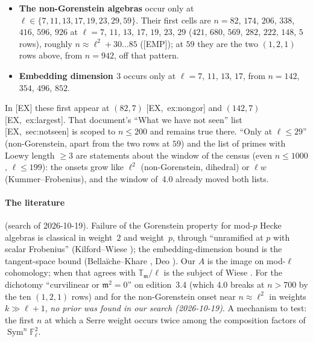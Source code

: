 \documentclass[11pt]{article}
\newcommand{\Fl}{\mathbb{F}_\ell}
\newcommand{\T}{\mathbb{T}}
\newcommand{\m}{\mathfrak{m}}
\newcommand{\Sym}{\operatorname{Sym}}
\newcommand{\EMP}{\textsf{\small[EMP]}}
\begin{document}
\begin{itemize}[leftmargin=1.6em,itemsep=1pt]
  $(T_2-a_2)^{2}\ne0$ recomputed at all four cells; the class is non-ordinary, $a_{59}\equiv0$. By owner ruling of 2026-11-06 [E] 1.25.0-pre.1
  restates (R): on irreducible classes it assumes ``of one weight'', exactly one pair $(w,j)$ of the test with a non-zero eigenspace, which the
  class at $59$, at $(16,0)$ and $(46,14)$, is not.)
\item \textbf{The non-Gorenstein algebras} occur only at $\ell\in\{7,11,13,17,19,23,29,59\}$. Their first cells are $n=82$, $174$, $206$,
  $338$, $416$, $596$, $926$ at $\ell=7$, $11$, $13$, $17$, $19$, $23$, $29$ ($421$, $680$, $569$, $282$, $222$, $148$, $5$ rows), roughly
  $n\approx\ell^{2}+30\dots85$ (\EMP); at $59$ they are the two $(1,2,1)$ rows above, from $n=942$, off that pattern.
\item \textbf{Embedding dimension $3$} occurs only at $\ell=7$, $11$, $13$, $17$, from $n=142$, $354$, $496$, $852$.
\end{itemize}
In [EX] these first appear at $(82,7)$ [EX,~ex:nongor] and $(142,7)$ [EX,~ex:largest]. That document's ``What we have not seen'' list
[EX,~sec:notseen] is scoped to $n\le200$ and remains true there. ``Only at $\ell\le29$'' (non-Gorenstein, apart from the two rows at $59$) and
the list of primes with Loewy length $\ge3$ are statements about the window of the census (even $n\le1000$, $\ell\le199$): the onsets grow like
$\ell^{2}$ (non-Gorenstein, dihedral) or $\ell w$ (Kummer--Frobenius), and the window of~4.0 already moved both lists.

\paragraph{The literature} (search of 2026-10-19). Failure of the Gorenstein property for mod-$p$ Hecke algebras is classical in weight~$2$
and weight~$p$, through ``unramified at $p$ with scalar Frobenius'' (Kilford--Wiese \cite{ph_kilford_wiese}); the embedding-dimension bound is
the tangent-space bound (Bella\"iche--Khare \cite{bk}, Deo \cite{deo}). Our $A$ is the image on mod-$\ell$ cohomology; when that agrees
with $\T_\m/\ell$ is the subject of Wiese \cite{ph_wiese_faithful}. For the dichotomy ``curvilinear or $\m^{2}=0$'' on edition~3.4 (which
4.0 breaks at $n>700$ by the ten $(1,2,1)$ rows) and for the non-Gorenstein onset near $n\approx\ell^{2}$ in weights $k\gg\ell+1$, \emph{no
prior was found in our search (2026-10-19)}. A mechanism to test: the first $n$ at which a Serre weight occurs twice among the composition
factors of $\Sym^{n}\Fl^{2}$.
\end{document}
